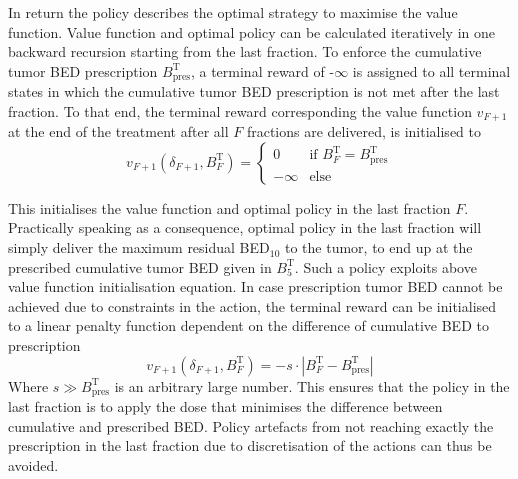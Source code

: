 \documentclass[\relativeRoot/ada.tex]{subfiles}
\begin{document}
In return the policy describes the optimal strategy to maximise the value function. Value function and optimal policy can be calculated iteratively in one backward recursion starting from the last fraction. To enforce the cumulative tumor BED prescription $B_{\text{pres}}^\text{T}$, a terminal reward of -$\infty$ is assigned to all terminal states in which the cumulative tumor BED prescription is not met after the last fraction. To that end, the terminal reward corresponding the value function $v_{F+1}$ at the end of the treatment after all $F$ fractions are delivered, is initialised to
\begin{equation*}
v_{F+1}(\delta_{F+1}, B^\text{T}_{F}) = 
\begin{cases}
0 & \text{if } B^\text{T}_F = B_{\text{pres}}^\text{T} \\
-\infty & \text{else}
\end{cases}
\end{equation*}

This initialises the value function and optimal policy in the last fraction $F$. Practically speaking as a consequence, optimal policy in the last fraction will simply deliver the maximum residual BED$_{10}$ to the tumor, to end up at the prescribed cumulative tumor BED given in $B_5^{\text{T}}$. Such a policy exploits above value function initialisation equation. In case prescription tumor BED cannot be achieved due to constraints in the action, the terminal reward can be initialised to a linear penalty function dependent on the difference of cumulative BED to prescription
\begin{equation*}
v_{F+1}(\delta_{F+1}, B^\text{T}_{F}) = 
- s \cdot \left| B^\text{T}_F - B_{\text{pres}}^\text{T} \right|
\end{equation*}
Where $s \gg B_{\text{pres}}^\text{T}$ is an arbitrary large number. This ensures that the policy in the last fraction is to apply the dose that minimises the difference between cumulative and prescribed BED. Policy artefacts from not reaching exactly the prescription in the last fraction due to discretisation of the actions can thus be avoided.
\end{document}
